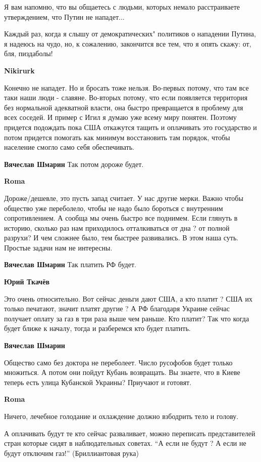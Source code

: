\begin{itemize}
Я вам напомню, что вы общаетесь с людьми, которых немало расстраиваете утверждением, что Путин не нападет...

Каждый раз, когда я слышу от демократических" политиков о нападении Путина, я
надеюсь на чудо, но, к сожалению, закончится все тем, что я опять скажу: от,
бля, пиздаболы!

\textbf{Nikirurk}

Конечно не нападет. Но и бросать тоже нельзя. Во-первых потому, что там все
таки наши люди - славяне. Во-вторых потому, что если появляется территория без
нормальной адекватной власти, она быстро превращается в проблему для всех
соседей. И пример с Игил я думаю уже всему миру понятен. Поэтому придется
подождать пока США откажутся тащить и оплачивать это государство и потом
придется помогать как минимум восстановить там порядок, чтобы население смогло
само себя обеспечивать.

\textbf{Вячеслав Шмарин}
Так потом дороже будет.

\textbf{Roma}

Дороже/дешевле, это пусть запад считает. У нас другие мерки. Важно чтобы
общество уже переболело, чтобы не надо было бороться с внутренним
сопротивлением. А сообща мы очень быстро все поднимем. Если глянуть в историю,
сколько раз нам приходилось отталкиваться от дна ? от полной разрухи?  И чем
сложнее было, тем быстрее развивались. В этом наша суть. Простые задачи нам не
интересны.

\textbf{Вячеслав Шмарин}
Так платить РФ будет.

\textbf{Юрий Ткачёв}

Это очень относительно. Вот сейчас деньги дают США, а кто платит ? США их
только печатают, значит платят другие ? А РФ благодаря Украине сейчас получает
оплату за газ в три раза выше чем раньше. Кто платит?  Так что когда будет
ближе к началу, тогда и разберемся кто будет платить.

\textbf{Вячеслав Шмарин}

Общество само без доктора не переболеет. Число русофобов будет только
множиться. А потом они пойдут Кубань возвращать. Вы знаете, что в Киеве теперь
есть улица Кубанской Украины? Приучают и готовят.

\textbf{Roma}

Ничего, лечебное голодание и охлаждение должно взбодрить тело и голову. 

А оплачивать будут те кто сейчас разваливает, можно переписать представителей
стран которые сидят в наблюдательных советах. \enquote{А если не будут ? А если
не будут отключим газ!} (Бриллиантовая рука)


\end{itemize}

